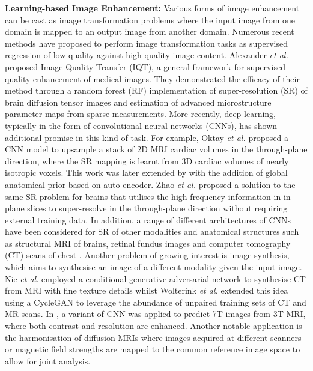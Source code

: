 \textbf{Learning-based Image Enhancement:}
Various forms of image enhancement can be cast as image transformation problems where the input image from one domain is mapped to an output image from another domain. Numerous recent methods have proposed to perform image transformation tasks as supervised regression of low quality against high quality image content. Alexander \emph{et al.} \cite{alexander2014image} proposed Image Quality Transfer (IQT), a general framework for supervised quality enhancement of medical images. They demonstrated the efficacy of their method through a random forest (RF) implementation of super-resolution (SR) of brain diffusion tensor images and estimation of advanced microstructure parameter maps from sparse measurements. More recently, deep learning, typically in the form of convolutional neural networks (CNNs), has shown additional promise in this kind of task. For example, Oktay \emph{et al.} \cite{oktay2016multi} proposed a CNN model to upsample a stack of 2D MRI cardiac volumes in the through-plane direction, where the SR mapping is learnt from 3D cardiac volumes of nearly isotropic voxels. This work was later extended by \cite{oktay2018anatomically} with the addition of global anatomical prior based on auto-encoder. Zhao \emph{et al.} \cite{zhao2018deep} proposed a solution to the same SR problem for brains that utilises the high frequency information in in-plane slices to super-resolve in the through-plane direction without requiring external training data. In addition, a range of different architectures of CNNs have been considered for SR of other modalities and anatomical structures such as structural MRI \cite{chen2018efficient} of brains, retinal fundus images \cite{mahapatra2017image} and computer tomography (CT) scans of chest \cite{yu2017computed}. Another problem of growing interest is image synthesis, which aims to synthesise an image of a different modality given the input image. Nie \emph{et al.} \cite{nie2018medical} employed a conditional generative adversarial network to synthesise CT from MRI with fine texture details whilst Wolterink \emph{et al.} \cite{wolterink2017deep} extended this idea using a CycleGAN \cite{zhu2017unpaired} to leverage the abundance of unpaired training sets of CT and MR scans. In \cite{bahrami2016convolutional}, a variant of CNN  was applied to predict 7T images from 3T MRI, where both contrast and resolution are enhanced. Another notable application is the harmonisation of diffusion MRIs \cite{karayumak2018harmonizing,tax2019cross,blumberg2018deeper,blumberg2019msp} where images acquired at different scanners or magnetic field strengths are mapped to the common reference image space to allow for joint analysis.  

